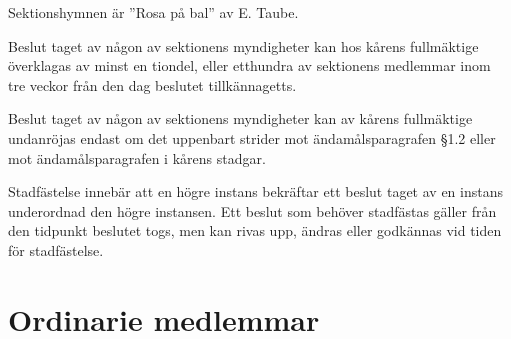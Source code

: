 \documentclass[stadgar]{dsekprotokoll}
\begin{document}
\begin{stadgeavsnitt}

Sektionshymnen är ''Rosa på bal'' av E. Taube.


Beslut taget av någon av sektionens myndigheter kan hos kårens fullmäktige
överklagas av minst en tiondel, eller etthundra av sektionens medlemmar
inom tre veckor från den dag beslutet tillkännagetts.


Beslut taget av någon av sektionens myndigheter kan av kårens fullmäktige
undanröjas endast om det uppenbart strider mot ändamålsparagrafen \S1.2
eller mot ändamålsparagrafen i kårens stadgar.


Stadfästelse innebär att en högre instans bekräftar ett beslut taget av en instans underordnad den högre instansen. Ett beslut som behöver stadfästas gäller från den tidpunkt beslutet togs, men kan rivas upp, ändras eller godkännas vid tiden för stadfästelse.

\end{stadgeavsnitt}

\section{Ordinarie medlemmar}
\end{document}

